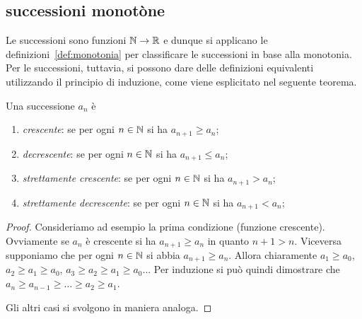 %

\subsection{successioni monotòne}

Le successioni sono funzioni ${\mathbb N} \to {\mathbb R}$ e dunque si applicano 
le definizioni~\ref{def:monotonia} per
classificare le successioni in base alla monotonia.
Per le successioni, tuttavia, si possono dare delle definizioni
equivalenti utilizzando il principio di induzione,
come viene esplicitato nel seguente teorema.

\begin{theorem}
\mymark{***}
Una successione $a_n$ è
\begin{enumerate}
\item \emph{crescente}: se per ogni $n\in {\mathbb N}$ si ha $a_{n+1} \ge a_n$;
\item \emph{decrescente}: se per ogni $n\in {\mathbb N}$ si ha $a_{n+1} \le a_n$;
\item \emph{strettamente crescente}: se per ogni $n\in {\mathbb N}$ si ha $a_{n+1}>a_n$;
\item \emph{strettamente decrescente}: se per ogni $n\in {\mathbb N}$ si ha
$a_{n+1}<a_n$;
\end{enumerate}
\end{theorem}
%
\begin{proof}
  Consideriamo ad esempio la prima condizione (funzione crescente).
Ovviamente se $a_n$ è crescente si ha $a_{n+1}\ge a_n$ in quanto $n+1 > n$.
Viceversa supponiamo che per ogni $n\in {\mathbb N}$ si abbia $a_{n+1}\ge a_n$.  Allora
chiaramente $a_1\ge a_0$, $a_2\ge a_1 \ge a_0$, $a_3 \ge a_2 \ge a_1 \ge a_0$...
Per induzione si può quindi dimostrare che  $a_n \ge a_{n-1} \ge \dots \ge a_2
\ge a_1$.

Gli altri casi si svolgono in maniera analoga.
\end{proof}

